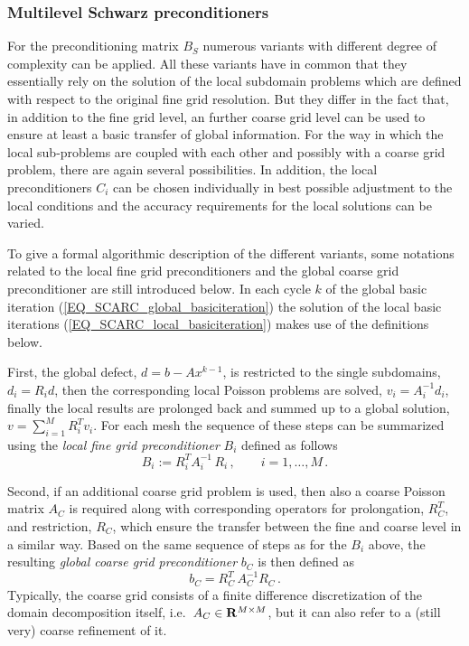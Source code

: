 \subsubsection{Multilevel Schwarz preconditioners}
For the preconditioning matrix $B_S$ %
numerous variants with different degree of complexity can be applied.
All these variants have in common that they essentially rely on the solution of the local subdomain problems which are defined with respect to the original fine grid resolution. 
But they differ in the fact that, in addition to the fine grid level, an further coarse grid level can be used to ensure at least a basic transfer of global information. 
%
For the way in which the local sub-problems are coupled with each other and possibly with a coarse grid problem, there are again several possibilities. 
In addition, the local preconditioners $C_i$ can be chosen individually in best possible adjustment to the local conditions and
the accuracy requirements for the local solutions can be varied. 

To give a formal algorithmic description of the different variants, some notations related to the local fine grid preconditioners and the global coarse grid preconditioner are still introduced below.
In each cycle $k$ of the global basic iteration (\ref{EQ_SCARC_global_basiciteration}) 
the solution of the local basic iterations (\ref{EQ_SCARC_local_basiciteration}) makes use of the definitions below. 

First, the global defect, $d = b - Ax^{k-1}$, is restricted to the single subdomains, $d_i=R_i d$, then the corresponding local Poisson problems are solved, $v_i=A_i^{-1}d_i$, finally the local results are  prolonged back and summed up to a global solution, $v=\sum_{i=1}^M R_i^T v_i$. 
For each mesh the sequence of these steps can be summarized using the {\it local fine grid preconditioner} $B_i$ defined as follows
\[ B_i := R_i^T A_i^{-1}\,R_i\,,\qquad i=1,\ldots, M\,. \]

Second, if an additional coarse grid problem is used, then also a coarse Poisson matrix $A_C$ is required along with corresponding operators for prolongation, $R_C^T$, and restriction, $R_C$, 
which ensure the transfer between the fine and coarse level in a similar way.
Based on the same sequence of steps as for the $B_i$ above, the resulting {\it global coarse grid preconditioner} $b_C$ is then defined as
\[ b_C = R_C^T \,A_C^{-1}  R_C\,.\] 
Typically, the coarse grid consists of a finite difference discretization of the domain decomposition itself, i.e.\ $A_C \in {\bf R}^{M \times M}$, but it can also refer to a (still very) coarse refinement of it. 

